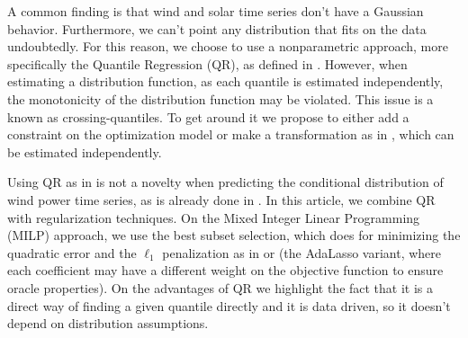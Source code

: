 






A common finding is that wind and solar time series don't have a Gaussian behavior. Furthermore, we can't point any distribution that fits on the data undoubtedly. For this reason, we choose to use a nonparametric approach, more specifically the Quantile Regression (QR), as defined in \cite{koenker_quantile_2006}.
However, when estimating a distribution function, as each quantile is estimated independently, the monotonicity of the distribution function may be violated. This issue is a known as crossing-quantiles. To get around it we propose to either add a constraint on the optimization model or make a transformation as in \cite{chernozhukov_quantile_2010}, which can be estimated independently.

Using QR as in \cite{koenker2005quantile} is not a novelty when predicting the conditional distribution of wind power time series, as is already done in \cite{moller_time-adaptive_2008,nielsen2006,bremnes_probabilistic_2004,wan_direct_2017}.
In this article, we combine QR with regularization techniques. On the Mixed Integer Linear Programming (MILP) approach, we use the best subset selection, which \cite{bertsimas_best_2015} does for minimizing the quadratic error and the $\ell_1$ penalization as in \cite{belloni_l1-penalized_2009} or \cite{ciuperca_adaptive_2016} (the AdaLasso variant, where each coefficient may have a different weight on the objective function to ensure oracle properties).
On the advantages of QR we highlight the fact that it is a direct way of finding a given quantile directly and it is data driven, so it doesn't depend on distribution assumptions. 

